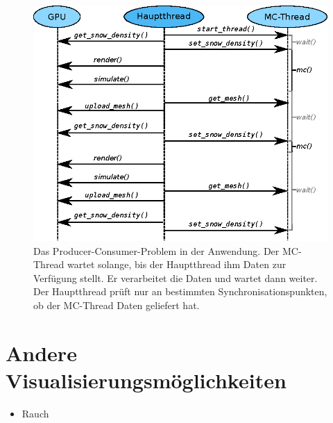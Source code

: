 \begin{figure}[h]
\centering
\includegraphics[width=12cm]{images/producer_consumer}
\caption{Das Producer-Consumer-Problem in der Anwendung. Der MC-Thread wartet solange, bis der Hauptthread ihm Daten zur Verfügung stellt. Er verarbeitet die Daten und wartet dann weiter. Der Hauptthread prüft nur an bestimmten Synchronisationspunkten, ob der MC-Thread Daten geliefert hat.}
\label{fig:implementation_fallen_snow_producer_consumer}
\end{figure}

\section{Andere Visualisierungsmöglichkeiten}

\begin{itemize}
\item Rauch
\end{itemize}
